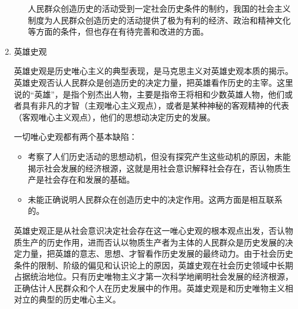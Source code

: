 \documentclass[device=pad,lang=cn,UTF8]{elegantbook}
\begin{document}
\begin{enumerate}
\begin{itemize}
            人民群众创造历史的活动受到一定社会历史条件的制约，我国的社会主义制度为人民群众创造历史的活动提供了极为有利的经济、政治和精神文化等方面的条件，但也存在有待完善和改进的方面。
        \end{itemize}
        \item 英雄史观\par
        英雄史观是历史唯心主义的典型表现，是马克思主义对英雄史观本质的揭示。英雄史观否认人民群众是创造历史的决定力量，把英雄看作历史的主宰。这里说的“英雄”，是指个别杰出人物，主要是指帝王将相和少数英雄人物，他们或者具有非凡的才智（主观唯心主义观点），或者是某种神秘的客观精神的代表（客观唯心主义观点），他们的思想动决定历史的发展。\par
        一切唯心史观都有两个基本缺陷：
        \begin{itemize}
            \item 考察了人们历史活动的思想动机，但没有探究产生这些动机的原因，未能揭示社会发展的经济根源，这就是用社会意识解释社会存在，否认物质生产是社会存在和发展的基础。
            \item 未能正确说明人民群众在创造历史中的决定作用。这两方面是相互联系的。
        \end{itemize}
        英雄史观正是从社会意识决定社会存在这一唯心史观的根本观点出发，否认物质生产的历史作用，进而否认以物质生产者为主体的人民群众是历史发展的决定力量，把英雄的意志、思想、才智看作历史发展的最终动力。由于社会历史条件的限制、阶级的偏见和认识论上的原因，英雄史观在社会历史领域中长期占据统治地位。只有历史唯物主义才第一次科学地阐明社会发展的经济根源，正确估计人民群众和个人在历史发展中的作用。英雄史观是和历史唯物主义相对立的典型的历史唯心主义。
    \end{enumerate}
\end{document}
